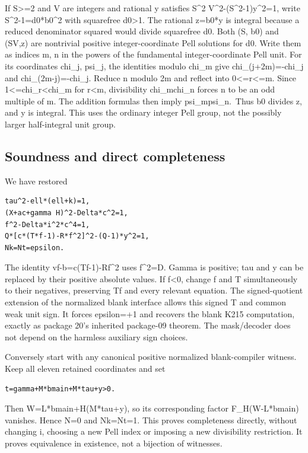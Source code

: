 \documentclass[
  10pt,
]{article}
\begin{document}
If S\textgreater=2 and V are integers and rational y satisfies S\^{}2
V\^{}2-(S\^{}2-1)y\^{}2=1, write S\^{}2-1=d0*b0\^{}2 with squarefree
d0\textgreater1. The rational z=b0*y is integral because a reduced
denominator squared would divide squarefree d0. Both (S, b0) and
(\textbar SV\textbar,\textbar z\textbar) are nontrivial positive
integer-coordinate Pell solutions for d0. Write them as indices m, n in
the powers of the fundamental integer-coordinate Pell unit. For its
coordinates chi\_j, psi\_j, the identities modulo chi\_m give
chi\_(j+2m)=-chi\_j and chi\_(2m-j)=-chi\_j. Reduce n modulo 2m and
reflect into 0\textless=r\textless=m. Since
1\textless=chi\_r\textless chi\_m for r\textless m, divisibility
chi\_m\textbar chi\_n forces n to be an odd multiple of m. The addition
formulas then imply psi\_m\textbar psi\_n.~Thus b0 divides
\textbar z\textbar, and y is integral. This uses the ordinary integer
Pell group, not the possibly larger half-integral unit group.

\subsection{Soundness and direct
completeness}\label{soundness-and-direct-completeness}

We have restored

\begin{verbatim}
tau^2-ell*(ell+k)=1,
(X+ac+gamma H)^2-Delta*c^2=1,
f^2-Delta*i^2*c^4=1,
Q*[c*(T*f-1)-R*f^2]^2-(Q-1)*y^2=1,
Nk=Nt=epsilon.
\end{verbatim}

The identity vf-b=c(Tf-1)-Rf\^{}2 uses f\^{}2=D. Gamma is positive; tau
and y can be replaced by their positive absolute values. If f\textless0,
change f and T simultaneously to their negatives, preserving Tf and
every relevant equation. The signed-quotient extension of the normalized
blank interface allows this signed T and common weak unit sign. It
forces epsilon=+1 and recovers the blank K215 computation, exactly as
package 20's inherited package-09 theorem. The mask/decoder does not
depend on the harmless auxiliary sign choices.

Conversely start with any canonical positive normalized blank-compiler
witness. Keep all eleven retained coordinates and set

\begin{verbatim}
t=gamma+M*bmain+M*tau+y>0.
\end{verbatim}

Then W=L*bmain+H(M*tau+y), so its corresponding factor F\_H(W-L*bmain)
vanishes. Hence N=0 and Nk=Nt=1. This proves completeness directly,
without changing i, choosing a new Pell index or imposing a new
divisibility restriction. It proves equivalence in existence, not a
bijection of witnesses.
\end{document}
